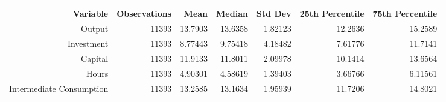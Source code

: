 \begin{tabular}{rrrrrrr}
  \hline
  \textbf{Variable} & \textbf{Observations} & \textbf{Mean} & \textbf{Median} & \textbf{Std Dev} & \textbf{25th Percentile} & \textbf{75th Percentile} \\\hline
  Output & 11393 & 13.7903 & 13.6358 & 1.82123 & 12.2636 & 15.2589 \\
  Investment & 11393 & 8.77443 & 9.75418 & 4.18482 & 7.61776 & 11.7141 \\
  Capital & 11393 & 11.9133 & 11.8011 & 2.09978 & 10.1414 & 13.6564 \\
  Hours & 11393 & 4.90301 & 4.58619 & 1.39403 & 3.66766 & 6.11561 \\
  Intermediate Consumption & 11393 & 13.2585 & 13.1634 & 1.95939 & 11.7206 & 14.8021 \\\hline
\end{tabular}

